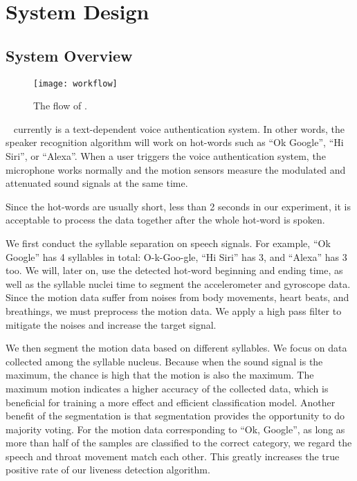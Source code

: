 \section{System Design}
\label{sec:system}
\subsection{System Overview}
\begin{figure*}[h]
	\centering
	\texttt{[image: workflow]}
	\caption{The flow of {\shortname}.}
	\label{fig:workflow}
\end{figure*}
\shortname~ currently is a text-dependent voice authentication system. In other words, the speaker recognition algorithm will work on hot-words such as ``Ok Google'', ``Hi Siri'', or ``Alexa''. When a user triggers the voice authentication system, the microphone works normally and the motion sensors measure the modulated and attenuated sound signals at the same time.
%

%
Since the hot-words are usually short, less than 2 seconds in our experiment, it is acceptable to process the data together after the whole hot-word is spoken.

We first conduct the syllable separation on speech signals. For example, ``Ok Google'' has 4 syllables in total: O-k-Goo-gle, ``Hi Siri'' has 3, and ``Alexa'' has 3 too. We will, later on, use the detected hot-word beginning and ending time, as well as the syllable nuclei time to segment the accelerometer and gyroscope data.
%
Since the motion data suffer from noises from body movements, heart beats, and breathings, we must preprocess the motion data. We apply a high pass filter to mitigate the noises and increase the target signal. 

We then segment the motion data based on different syllables. We focus on data collected among the syllable nucleus. Because when the sound signal is the maximum, the chance is high that the motion is also the maximum. The maximum motion indicates a higher accuracy of the collected data, which is beneficial for training a more effect and efficient classification model.
%
Another benefit of the segmentation is that segmentation provides the opportunity to do majority voting. For the motion data corresponding to ``Ok, Google'', as long as more than half of the samples are classified to the correct category, we regard the speech and throat movement match each other. This greatly increases the true positive rate of our liveness detection algorithm.

